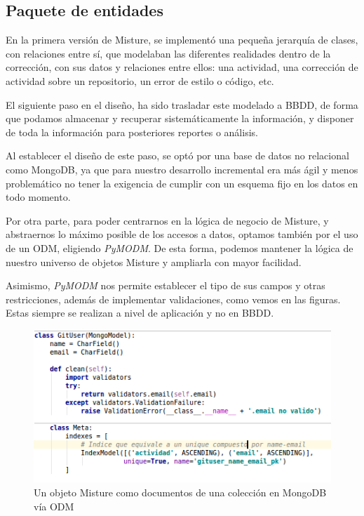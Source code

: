 \subsection{Paquete de entidades} 
\label{subsec:paq_entities}

En la primera versión de Misture, se implementó una pequeña jerarquía de clases, con relaciones entre sí, que modelaban las diferentes realidades dentro de la corrección, con sus datos y relaciones entre ellos: una actividad, una corrección de actividad sobre un repositorio, un error de estilo o código, etc.


El siguiente paso en el diseño, ha sido trasladar este modelado a BBDD, de forma que podamos almacenar y recuperar sistemáticamente la información, y disponer de toda la información para posteriores reportes o análisis.


Al establecer el diseño de este paso, se optó por una base de datos no relacional como MongoDB, ya que para nuestro desarrollo incremental era más ágil y menos problemático no tener la exigencia de cumplir con un esquema fijo en los datos en todo momento.


Por otra parte, para poder centrarnos en la lógica de negocio de Misture, y abstraernos lo máximo posible de los accesos a datos, optamos también por el uso de un ODM, eligiendo \textit{PyMODM}. De esta forma, podemos mantener la lógica de nuestro universo de objetos Misture y ampliarla con mayor facilidad.


Asimismo, \textit{PyMODM} nos permite establecer el tipo de sus campos y otras restricciones, además de implementar validaciones, como vemos en las figuras. Estas siempre se realizan a nivel de aplicación y no en BBDD.


\begin{figure}[H]
   \centering
   \includegraphics[width=16cm]{img/Selection_026_mongomodel}
   \caption{Un objeto Misture como documentos de una colección en MongoDB vía ODM}
   \label{figura:iter2}
\end{figure}

